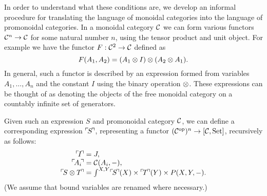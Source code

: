 \documentclass{robincs}
\let\origint = \int
\def\int{{\textstyle\origint}}
\begin{document}
In order to understand what these conditions are, we develop
an informal procedure for translating the language
of monoidal categories into the language of promonoidal categories.
In a monoidal category $\mathcal{C}$ we can form various functors
$\mathcal{C}^n\to\mathcal{C}$ for some natural number $n$, using the tensor
product and unit object. For example we have the functor
$F:\mathcal{C}^2\to\mathcal{C}$ defined as
\[
        F(A_1, A_2) = (A_1 \tn I) \tn (A_2 \tn A_1).
\]
In general, such a functor is described by an expression
formed from variables $A_1, \dots, A_n$ and the constant $I$
using the binary operation $\tn$. These expressions
can be thought of as denoting the objects of the free monoidal category
on a countably infinite set of generators.

\def\qq#1{\raise1pt\hbox{$\ulcorner$}\!#1\!\raise1pt\hbox{$\urcorner$}}%
Given such an expression $S$ and promonoidal category $\mathcal{C}$, we can
define a corresponding expression $\qq{S}$, representing a
functor $(\mathcal{C}^\mathrm{op})^n\to[\mathcal{C},\mathrm{Set}]$, recursively as follows:
\[\begin{array}{r@{{}={}}l}
        \qq{I}     & J,\\
        \qq{A_i}   & \C(A_i, -),\\
        \qq{S\tn T}& \int^{X,Y} \qq S(X) \times \qq T(Y) \times P(X,Y,-).
\end{array}\]
(We assume that bound variables are renamed where necessary.)
\end{document}
